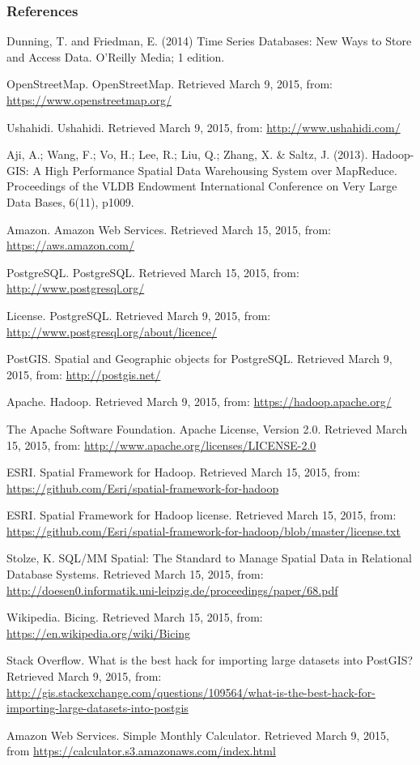 \documentclass[hyperref={pdfpagelabels=true}]{beamer}
\begin{document}
\begin{frame}
\frametitle{References}
\begin{itemize}
\tiny{
\item Dunning, T. and Friedman, E. (2014) Time Series Databases: New Ways to Store and Access Data. O'Reilly Media; 1 edition.
\item OpenStreetMap. OpenStreetMap. Retrieved March 9, 2015, from: \url{https://www.openstreetmap.org/}
\item Ushahidi. Ushahidi. Retrieved March 9, 2015, from: \url{http://www.ushahidi.com/}
\item Aji, A.; Wang, F.; Vo, H.; Lee, R.; Liu, Q.; Zhang, X. \& Saltz, J. (2013). Hadoop-GIS: A High Performance Spatial Data Warehousing System over MapReduce. Proceedings of the VLDB Endowment International Conference on Very Large Data Bases, 6(11), p1009.
\item Amazon. Amazon Web Services. Retrieved March 15, 2015, from: \url{https://aws.amazon.com/}
\item PostgreSQL. PostgreSQL. Retrieved March 15, 2015, from: \url{http://www.postgresql.org/}
\item License. PostgreSQL. Retrieved March 9, 2015, from: \url{http://www.postgresql.org/about/licence/}
\item PostGIS. Spatial and Geographic objects for PostgreSQL. Retrieved March 9, 2015, from: \url{http://postgis.net/}
\item Apache. Hadoop. Retrieved March 9, 2015, from: \url{https://hadoop.apache.org/}
\item The Apache Software Foundation. Apache License, Version 2.0. Retrieved March 15, 2015, from: \url{http://www.apache.org/licenses/LICENSE-2.0}
\item ESRI. Spatial Framework for Hadoop. Retrieved March 15, 2015, from: \url{https://github.com/Esri/spatial-framework-for-hadoop}
\item ESRI.  Spatial Framework for Hadoop license. Retrieved March 15, 2015, from: \url{https://github.com/Esri/spatial-framework-for-hadoop/blob/master/license.txt}
\item Stolze, K. SQL/MM Spatial: The Standard to Manage Spatial Data in Relational Database Systems. Retrieved March 15, 2015, from: \url{http://doesen0.informatik.uni-leipzig.de/proceedings/paper/68.pdf}
\item Wikipedia. Bicing. Retrieved March 15, 2015, from: \url{https://en.wikipedia.org/wiki/Bicing}
\item Stack Overflow. What is the best hack for importing large datasets into PostGIS? Retrieved March 9, 2015, from: \url{http://gis.stackexchange.com/questions/109564/what-is-the-best-hack-for-importing-large-datasets-into-postgis}
\item Amazon Web Services. Simple Monthly Calculator. Retrieved March 9, 2015, from \url{https://calculator.s3.amazonaws.com/index.html}
}
\end{itemize}
\end{frame}
\end{document}
